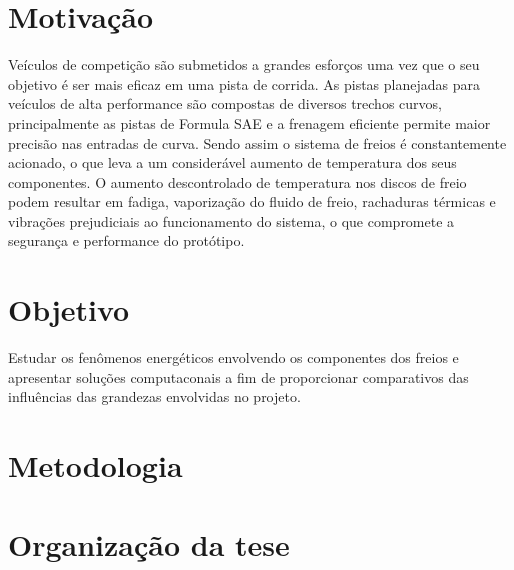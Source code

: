 \section{Motivaç{\~ a}o}
Veículos de competição são submetidos a grandes esforços uma vez que o seu objetivo é ser mais eficaz em uma pista de corrida. As pistas planejadas para veículos de alta performance são compostas de diversos trechos curvos, principalmente as pistas de Formula SAE e a frenagem eficiente permite maior precisão nas entradas de curva. Sendo assim o sistema de freios é constantemente acionado, o que leva a um considerável aumento de temperatura dos seus componentes. O aumento descontrolado de temperatura nos discos de freio podem resultar em fadiga, vaporização do fluido de freio, rachaduras térmicas e vibrações prejudiciais ao funcionamento do sistema, o que compromete a segurança e performance do protótipo.

\section{Objetivo}
Estudar os fenômenos energéticos envolvendo os componentes dos freios e apresentar soluções computaconais a fim de proporcionar comparativos das influências das grandezas envolvidas no projeto.

\section{Metodologia}

\section{Organizaç{\~ a}o da tese}
